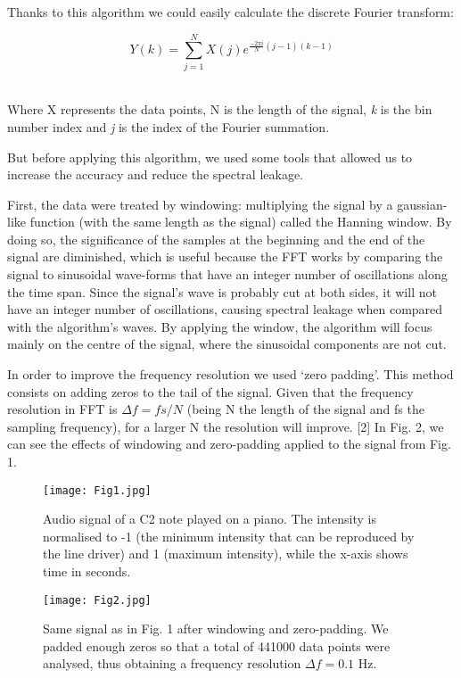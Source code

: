 \documentclass[twocolumn]{revtex4}
\begin{document}
Thanks to this algorithm we could easily calculate the discrete Fourier transform:

\begin{equation}
Y(k) = \sum_{j=1}^{N} X(j) e^{\frac{-2 \pi i}{N} (j-1)(k-1)}
\end{equation}\

Where X represents the data points, N is the length of the signal, \textsl{k} is the bin number index and \textsl{j} is the index of the Fourier summation.\newline

But before applying this algorithm, we used some tools that allowed us to increase the accuracy and reduce the spectral leakage. 

First, the data were treated by windowing: multiplying the signal by a gaussian-like function (with the same length as the signal) called the Hanning window. By doing so, the significance of the samples at the beginning and the end of the signal are diminished, which is useful because the FFT works by comparing the signal to sinusoidal wave-forms that have an integer number of oscillations along the time span. Since the signal's wave is probably cut at both sides, it will not have an integer number of oscillations, causing spectral leakage when compared with the algorithm's waves. By applying the window, the algorithm will focus mainly on the centre of the signal, where the sinusoidal components are not cut.

In order to improve the frequency resolution we used `zero padding'. This method consists on adding zeros to the tail of the signal. Given that the frequency resolution in FFT is $\Delta f =fs/N$ (being N the length of the signal and fs the sampling frequency), for a larger N the resolution will improve. [2] \newline In Fig. 2, we can see the effects of windowing and zero-padding applied to the signal from Fig. 1.

\begin{figure}[h]
\centering
\texttt{[image: Fig1.jpg]}
\caption{Audio signal of a C2 note played on a piano. The intensity is normalised to -1 (the minimum intensity that can be reproduced by the line driver) and 1 (maximum intensity), while the x-axis shows time in seconds.}
\end{figure}

\begin{figure}[h]
\centering
\texttt{[image: Fig2.jpg]}
\caption{Same signal as in Fig. 1 after windowing and zero-padding. We padded enough zeros so that a total of 441000 data points were analysed, thus obtaining a frequency resolution $\Delta f =0.1 $ Hz.}
\end{figure}
\end{document}
